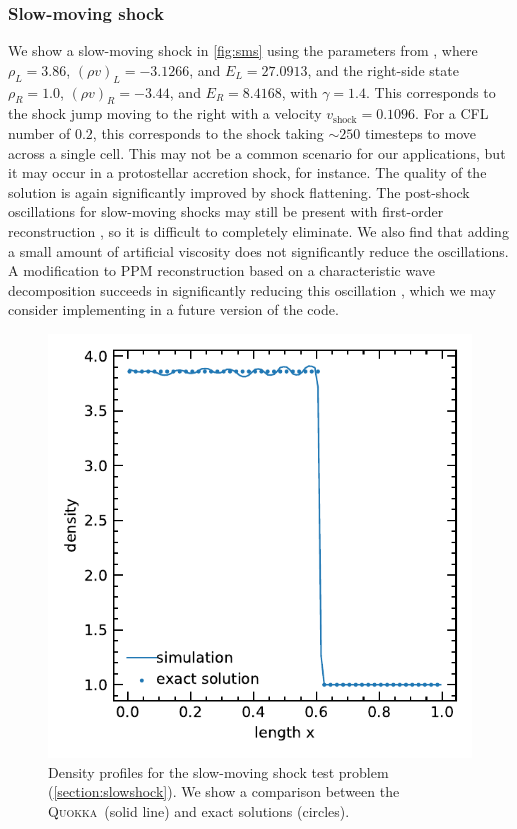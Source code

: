 \documentclass[fleqn,usenatbib]{mnras}
\newcommand{\quokka}{\textsc{Quokka}}
\begin{document}
\subsubsection{Slow-moving shock}
\label{section:slowshock}
We show a slow-moving shock in \autoref{fig:sms} using the parameters from \cite{Jin_1996}, where $\rho_L = 3.86$, $(\rho v)_L = -3.1266$, and $E_L = 27.0913$, and the right-side state $\rho_R = 1.0$, $(\rho v)_R = -3.44$, and $E_R = 8.4168$, with $\gamma = 1.4$. This corresponds to the shock jump moving to the right with a velocity $v_{\text{shock}} = 0.1096$. For a CFL number of $0.2$, this corresponds to the shock taking $\sim 250$ timesteps to move across a single cell. This may not be a common scenario for our applications, but it may occur in a protostellar accretion shock, for instance. The quality of the solution is again significantly improved by shock flattening. The post-shock oscillations for slow-moving shocks may still be present with first-order reconstruction \citep{Jin_1996,Lee_2011}, so it is difficult to completely eliminate. We also find that adding a small amount of artificial viscosity does not significantly reduce the oscillations. A modification to PPM reconstruction based on a characteristic wave decomposition succeeds in significantly reducing this oscillation \citep{Lee_2011}, which we may consider implementing in a future version of the code.
\begin{figure}
    \includegraphics[width=\columnwidth]{hydro_sms_1.0000.pdf}
    \caption{Density profiles for the slow-moving shock test problem (\autoref{section:slowshock}). We show a comparison between the \quokka~(solid line) and exact solutions (circles).}
    \label{fig:sms}
\end{figure}
\end{document}
